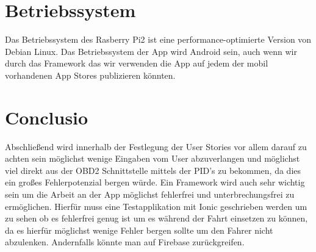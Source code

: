 \section {Betriebssystem}
Das Betriebssystem des Rasberry Pi2 ist eine performance-optimierte Version von Debian Linux.
Das Betriebssystem der App wird Android sein, auch wenn wir durch das Framework das wir verwenden die App auf jedem der mobil vorhandenen App Stores publizieren könnten.


\section {Conclusio}
Abschließend wird innerhalb der Festlegung der User Stories vor allem darauf zu achten sein möglichst wenige Eingaben vom User abzuverlangen und möglichst viel direkt aus der OBD2 Schnittstelle mittels der PID's zu bekommen, da dies ein großes Fehlerpotenzial bergen würde. 
Ein Framework wird auch sehr wichtig sein um die Arbeit an der App möglichst fehlerfrei und unterbrechungsfrei zu ermöglichen. Hierfür muss eine Testapplikation mit Ionic geschrieben werden um zu sehen ob es fehlerfrei genug ist um es während der Fahrt einsetzen zu können, da es hierfür möglichst wenige Fehler bergen sollte um den Fahrer nicht abzulenken. Andernfalls könnte man auf Firebase zurückgreifen.
